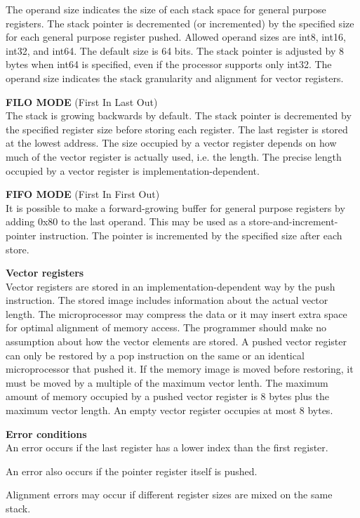 \documentclass[forwardcom.tex]{subfiles}
\begin{document}
The operand size indicates the size of each stack space for general purpose registers. The stack pointer is decremented (or incremented) by the specified size for each general purpose register pushed. Allowed operand sizes are int8, int16, int32, and int64. The default size is 64 bits. The stack pointer is adjusted by 8 bytes when int64 is specified, even if the processor supports only int32. The operand size indicates the stack granularity and alignment for vector registers.
\vv

\textbf{FILO MODE} (First In Last Out) \\
The stack is growing backwards by default. 
The stack pointer is decremented by the specified register size before storing each register. The last register is stored at the lowest address. 
The size occupied by a vector register depends on how much of the vector register is actually used, i.e. the length. The precise length occupied by a vector register is implementation-dependent.
\vv
 
\textbf{FIFO MODE} (First In First Out) \\
It is possible to make a forward-growing buffer for general purpose registers by adding 0x80 to the last operand. This may be used as a store-and-increment-pointer instruction. The pointer is incremented by the specified size after each store.
\vv

\textbf{Vector registers}\\
Vector registers are stored in an implementation-dependent way by the push instruction. The stored image includes information about the actual vector length. 
The microprocessor may compress the data or it may insert extra space for optimal alignment of memory access. The programmer should make no assumption about how the vector elements are stored. A pushed vector register can only be restored by a pop instruction on the same or an identical microprocessor that pushed it. If the memory image is moved before restoring, it must be moved by a multiple of the maximum vector lenth. The maximum amount of memory occupied by a pushed vector register is 8 bytes plus the maximum vector length. An empty vector register occupies at most 8 bytes.
\vv

\textbf{Error conditions}\\
An error occurs if the last register has a lower index than the first register.
\vv

An error also occurs if the pointer register itself is pushed.
\vv

Alignment errors may occur if different register sizes are mixed on the same stack.
\vv
\end{document}
